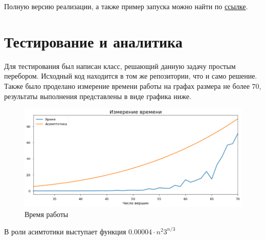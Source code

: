 \documentclass[12pt]{article}
\begin{document}
Полную версию реализации, а также пример запуска можно найти по \href{https://github.com/wheeltune/Difficulties/tree/master/Practice}{ссылке}.

\section{Тестирование и аналитика}

Для тестирования был написан класс, решающий данную задачу простым пе\-ре\-бо\-ром. Исходный код находится в том же репозитории, что и само решение. Также было проделано измерение времени работы на графах размера не более $70$, результаты вы\-пол\-не\-ния представлены в виде графика ниже.

\begin{figure}[H]
    \centering
    \includegraphics[width=\linewidth]{plot.png}
    \caption{Время работы}
\end{figure}

В роли асимтотики выступает функция $0.00004 \cdot n^2 3^{n / 3}$

\newpage
\tableofcontents

\newpage

\end{document}
